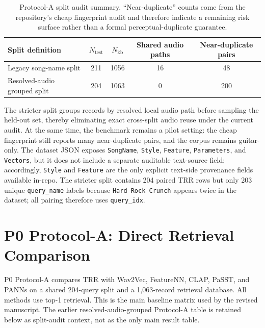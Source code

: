 \documentclass{article}
\begin{document}
\begin{table}[htbp]
	\centering
	\caption{Protocol-A split audit summary. ``Near-duplicate'' counts come from the repository's cheap fingerprint audit and therefore indicate a remaining risk surface rather than a formal perceptual-duplicate guarantee.}
	\label{tab:protocolA_split_audit}
	\small
	\begin{tabular}{lcccc}
		\toprule
		\textbf{Split definition} & \textbf{$N_{\text{test}}$} & \textbf{$N_{\text{kb}}$} & \textbf{Shared audio paths} & \textbf{Near-duplicate pairs} \\
		\midrule
		Legacy song-name split & 211 & 1056 & 16 & 48 \\
		Resolved-audio grouped split & 204 & 1063 & 0 & 200 \\
		\bottomrule
	\end{tabular}
\end{table}

The stricter split groups records by resolved local audio path before sampling the held-out set, thereby eliminating exact cross-split audio reuse under the current audit. At the same time, the benchmark remains a pilot setting: the cheap fingerprint still reports many near-duplicate pairs, and the corpus remains guitar-only. The dataset JSON exposes \texttt{SongName}, \texttt{Style}, \texttt{Feature}, \texttt{Parameters}, and \texttt{Vectors}, but it does not include a separate auditable text-source field; accordingly, \texttt{Style} and \texttt{Feature} are the only explicit text-side provenance fields available in-repo. The stricter split contains 204 paired TRR rows but only 203 unique \texttt{query\_name} labels because \texttt{Hard Rock Crunch} appears twice in the dataset; all pairing therefore uses \texttt{query\_idx}.

\section{P0 Protocol-A: Direct Retrieval Comparison}

P0 Protocol-A compares TRR with Wav2Vec, FeatureNN, CLAP, PaSST, and PANNs on a shared 204-query split and a 1,063-record retrieval database. All methods use top-1 retrieval. This is the main baseline matrix used by the revised manuscript. The earlier resolved-audio-grouped Protocol-A table is retained below as split-audit context, not as the only main result table.
\end{document}
